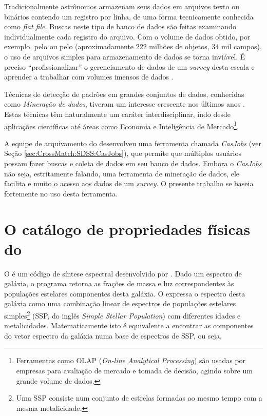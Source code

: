 Tradicionalmente astrônomos armazenam seus dados em arquivos texto ou binários
contendo um registro por linha, de uma forma tecnicamente conhecida como {\em
flat file}. Buscas neste tipo de banco de dados são feitas examinando
individualmente cada registro do arquivo. Com o volume de dados obtido, por
exemplo, pelo \SDSS ou pelo \galex (aproximadamente 222 milhões de objetos, 34
mil campos), o uso de arquivos simples para armazenamento de dados se torna
inviável. É preciso ``profissionalizar'' o gerenciamento de dados de um {\em
survey} desta escala e aprender a trabalhar com volumes imensos de dados
\citep{Bell2006}.

Técnicas de detecção de padrões em grandes conjuntos de dados, conhecidas como
{\em Mineração de dados}, tiveram um interesse crescente nos últimos anos
\citep{SIGKDD2011}. Estas técnicas têm naturalmente um caráter interdisciplinar,
indo desde aplicações científicas até áreas como Economia \citep{Spanos2000} e
Inteligência de Mercado\footnote{Ferramentas como OLAP ({\em On-line Analytical
Processing}) são usadas por empresas para avaliação de mercado e tomada de
decisão, agindo sobre um grande volume de dados.}.

A equipe de arquivamento do \SDSS desenvolveu uma ferramenta chamada {\em
CasJobs} (ver Seção \ref{sec:CrossMatch:SDSS:CasJobs}), que permite que
múltiplos usuários possam fazer buscas e coleta de dados em seu banco de dados.
Embora o {\em CasJobs} não seja, estritamente falando, uma ferramenta de
mineração de dados, ele facilita e muito o acesso aos dados de um {\em survey}.
O presente trabalho se baseia fortemente no uso desta ferramenta.



\section{O catálogo de propriedades físicas do \STARLIGHT}
\label{sec:Intro:Starlight}

O \starlight é um código de síntese espectral desenvolvido por
\citet{CidFernandes2005}. Dado um espectro de galáxia, o programa retorna as
frações de massa e luz correspondentes às populações estelares componentes desta
galáxia. O \starlight expressa o espectro desta galáxia como uma combinação
linear de espectros de populações estelares simples\footnote{Uma SSP consiste
num conjunto de estrelas formadas ao mesmo tempo com a mesma metalicidade.}
(SSP, do inglês {\em Simple Stellar Population}) com diferentes idades e
metalicidades. Matematicamente isto é equivalente a encontrar as componentes do
vetor espectro da galáxia numa base de espectros de SSP, ou seja,

